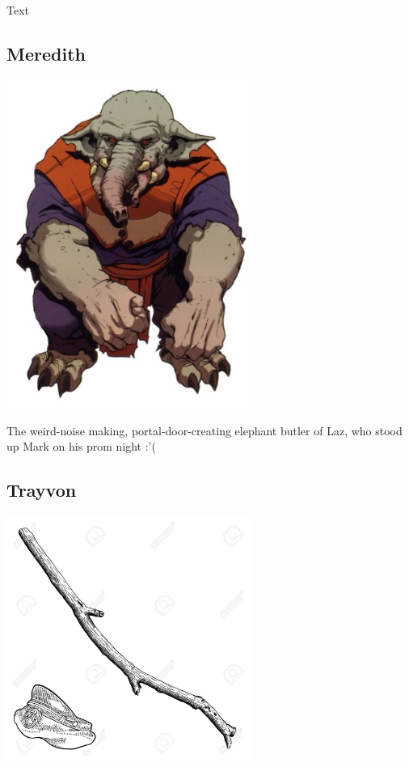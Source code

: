 \noindent 

Text

\smallskip

\subsection*{Meredith} 

\begin{center}
\includegraphics[width=80mm]{./content/img/meredith.png}
\begin{figure}[h]
\end{figure}
\end{center}

\noindent 

The weird-noise making, portal-door-creating elephant butler of Laz, who stood up Mark on his prom night :'(

\smallskip

\subsection*{Trayvon } 

\begin{center}
\includegraphics[width=80mm]{./content/img/xxx.png}
\begin{figure}[h]
\end{figure}
\end{center}


